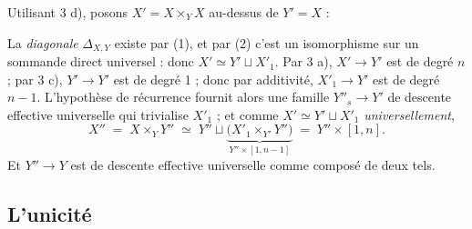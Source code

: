 \documentclass[11pt,a4paper]{article}
\begin{document}
Utilisant 3 d), posons $X' = X \times_{Y} X$ au-dessus de $Y' = X$ :


La \emph{diagonale} $\Delta_{X,Y}$ existe par (1), et par (2) c'est un
isomorphisme sur un sommande direct universel : donc
$X' \simeq Y' \sqcup X'_{1}$. Par 3 a), $X' \to Y'$ est de degré $n$ ; par 3 c),
$Y' \to Y'$ est de degré 1 ; donc par additivité, $X'_{1} \to Y'$ est de degré
$n - 1$. L'hypothèse de récurrence fournit alors une famille
$Y''_{s} \to Y'$ de descente effective universelle qui trivialise $X'_{1}$ ;
et comme $X' \simeq Y' \sqcup X'_{1}$ \emph{universellement},
\[
  X'' \;=\; X \times_{Y} Y'' \;\simeq\; Y'' \sqcup
  \underbrace{\bigl(X'_{1} \times_{Y'} Y''\bigr)}_{\textstyle
  Y'' \times [1, n-1]} \;=\; Y'' \times [1, n] .
\]
Et $Y'' \to Y$ est de descente effective universelle comme composé de deux
tels.

\subsection*{L'unicité}
\end{document}
